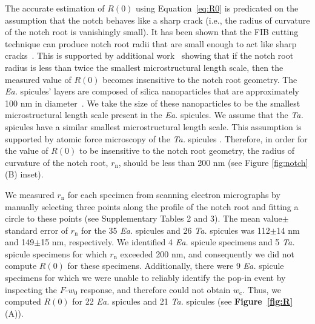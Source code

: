 \documentclass[12pt,onecolumn]{article}
\makeatletter
\newcommand{\TA}{\textit{Ta.\@}\xspace}
\newcommand{\EA}{\textit{Ea.\@}\xspace}
\makeatother
\begin{document}
The accurate estimation of $R(0)$ using Equation~\eqref{eq:R0} is predicated on the assumption that the notch behaves like a sharp crack (i.e., the radius of curvature of the notch root is vanishingly small). It has been shown that the FIB cutting technique can produce notch root radii that are small enough to act like sharp cracks~\cite{fett2008fracture}. This is supported by additional work~\cite{kubler1997fracture} showing that if the notch root radius is less than twice the smallest microstructural length scale, then the measured value of $R(0)$ becomes insensitive to the notch root geometry. The \EA spicules' layers are composed of silica nanoparticles that are approximately 100 nm in diameter~\cite{aizenberg2005skeleton}. We take the size of these nanoparticles to be the smallest microstructural length scale present in the \EA spicules. We assume that the \TA spicules have a similar smallest microstructural length scale. This assumption is supported by atomic force microscopy of the \TA spicules \cite{weaver2003nanostructural}. Therefore, in order for the value of $R(0)$ to be insensitive to the notch root geometry, the radius of curvature of the notch root, $r_\mathrm{n}$, should be less than 200 nm (see Figure \ref{fig:notch} (B) inset). 

We measured $r_\mathrm{n}$ for each specimen from scanning electron micrographs by manually selecting three points along the profile of the notch root and fitting a circle to these points (see Supplementary Tables 2 and 3). The mean value$\pm$standard error of $r_\mathrm{n}$ for the 35 \EA spicules and 26 \TA spicules was 112$\pm$14 nm and 149$\pm$15 nm, respectively. We identified 4 \EA spicule specimens and 5 \TA spicule specimens for which $r_\mathrm{n}$ exceeded 200 nm, and consequently we did not compute $R(0)$ for these specimens. Additionally, there were 9 \EA spicule specimens for which we were unable to reliably identify the pop-in event by inspecting the $F$-$w_0$ response, and therefore could not obtain $w_\mathrm{c}$. Thus, we computed $R(0)$ for 22 \EA spicules and 21 \TA spicules (see {\bf Figure~\ref{fig:R}} (A)).
\end{document}
